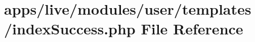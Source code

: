 \hypertarget{live_2modules_2user_2templates_2index_success_8php}{\section{apps/live/modules/user/templates/index\-Success.php File Reference}
\label{live_2modules_2user_2templates_2index_success_8php}
}
